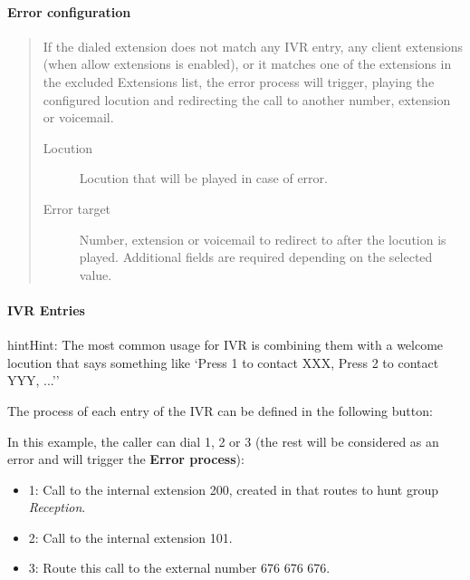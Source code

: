 \documentclass[letterpaper,10pt,english]{sphinxmanual}
\begin{document}
\paragraph{Error configuration}
\label{administration_portal/client/vpbx/routing_endpoints/ivrs:error-configuration}\begin{quote}

If the dialed extension does not match any IVR entry, any client extensions
(when allow extensions is enabled), or it matches one of the extensions in the
excluded Extensions list, the error process will trigger, playing the configured
locution and redirecting the call to another number, extension or voicemail.
\begin{description}
\item[{Locution}] \leavevmode
Locution that will be played in case of error.

\item[{Error target}] \leavevmode
Number, extension or voicemail to redirect to after the locution is played.
Additional fields are required depending on the selected value.

\end{description}
\end{quote}


\paragraph{IVR Entries}
\label{administration_portal/client/vpbx/routing_endpoints/ivrs:ivr-entries}
\begin{notice}{hint}{Hint:}
The most common usage for IVR is combining them with a welcome
locution that says something like `Press 1 to contact XXX, Press 2 to
contact YYY, ...''
\end{notice}

The process of each entry of the IVR can be defined in the following button:

In this example, the caller can dial 1, 2 or 3 (the rest will be considered as
an error and will trigger the \textbf{Error process}):
\begin{itemize}
\item {} 
1: Call to the internal extension 200, created in {\hyperref[administration_portal/client/vpbx/routing_endpoints/hunt_groups:huntgroups]{}} that routes to hunt group \emph{Reception}.

\item {} 
2: Call to the internal extension 101.

\item {} 
3: Route this call to the external number 676 676 676.

\end{itemize}
\end{document}
